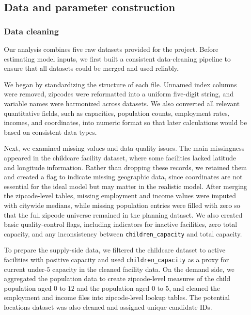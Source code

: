 \documentclass[11pt]{article}
\newcommand{\1}{\mathbb{I}}
\begin{document}
\subsection{Data and parameter construction}

\subsubsection{Data cleaning}

Our analysis combines five raw datasets provided for the project. Before estimating model inputs, we first built a consistent data-cleaning pipeline to ensure that all datasets could be merged and used reliably.

We began by standardizing the structure of each file. Unnamed index columns were removed, zipcodes were reformatted into a uniform five-digit string, and variable names were harmonized across datasets. We also converted all relevant quantitative fields, such as capacities, population counts, employment rates, incomes, and coordinates, into numeric format so that later calculations would be based on consistent data types.

Next, we examined missing values and data quality issues. The main missingness appeared in the childcare facility dataset, where some facilities lacked latitude and longitude information. Rather than dropping these records, we retained them and created a flag to indicate missing geographic data, since coordinates are not essential for the ideal model but may matter in the realistic model. After merging the zipcode-level tables, missing employment and income values were imputed with citywide medians, while missing population entries were filled with zero so that the full zipcode universe remained in the planning dataset. We also created basic quality-control flags, including indicators for inactive facilities, zero total capacity, and any inconsistency between \texttt{children\_capacity} and total capacity.

To prepare the supply-side data, we filtered the childcare dataset to active facilities with positive capacity and used \texttt{children\_capacity} as a proxy for current under-\(5\) capacity in the cleaned facility data. On the demand side, we aggregated the population data to create zipcode-level measures of the child population aged \(0\) to \(12\) and the population aged \(0\) to \(5\), and cleaned the employment and income files into zipcode-level lookup tables. The potential locations dataset was also cleaned and assigned unique candidate IDs.
\end{document}
